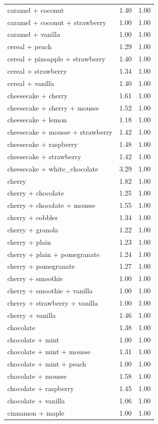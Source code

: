 \begin{table}
\begin{tabular}{lrr}
caramel + coconut & 1.40 & 1.00 \\
caramel + coconut + strawberry & 1.00 & 1.00 \\
caramel + vanilla & 1.00 & 1.00 \\
cereal + peach & 1.29 & 1.00 \\
cereal + pineapple + strawberry & 1.40 & 1.00 \\
cereal + strawberry & 1.34 & 1.00 \\
cereal + vanilla & 1.40 & 1.00 \\
cheesecake + cherry & 1.61 & 1.00 \\
cheesecake + cherry + mousse & 1.52 & 1.00 \\
cheesecake + lemon & 1.18 & 1.00 \\
cheesecake + mousse + strawberry & 1.42 & 1.00 \\
cheesecake + raspberry & 1.48 & 1.00 \\
cheesecake + strawberry & 1.42 & 1.00 \\
cheesecake + white\_chocolate & 3.29 & 1.00 \\
cherry & 1.82 & 1.00 \\
cherry + chocolate & 1.25 & 1.00 \\
cherry + chocolate + mousse & 1.55 & 1.00 \\
cherry + cobbler & 1.34 & 1.00 \\
cherry + granola & 1.22 & 1.00 \\
cherry + plain & 1.23 & 1.00 \\
cherry + plain + pomegranate & 1.24 & 1.00 \\
cherry + pomegranate & 1.27 & 1.00 \\
cherry + smoothie & 1.00 & 1.00 \\
cherry + smoothie + vanilla & 1.00 & 1.00 \\
cherry + strawberry + vanilla & 1.00 & 1.00 \\
cherry + vanilla & 1.46 & 1.00 \\
chocolate & 1.38 & 1.00 \\
chocolate + mint & 1.00 & 1.00 \\
chocolate + mint + mousse & 1.31 & 1.00 \\
chocolate + mint + peach & 1.00 & 1.00 \\
chocolate + mousse & 1.58 & 1.00 \\
chocolate + raspberry & 1.45 & 1.00 \\
chocolate + vanilla & 1.06 & 1.00 \\
cinnamon + maple & 1.00 & 1.00 \\

\end{tabular}
\end{table}
